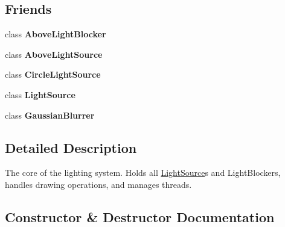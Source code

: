 \subsection*{Friends}
\begin{DoxyCompactItemize}
\item 
class {\bfseries Above\+Light\+Blocker}\hypertarget{classlighting_1_1LightLayer_a1c89aa6deb964112100d6dfe018a3108}{}\label{classlighting_1_1LightLayer_a1c89aa6deb964112100d6dfe018a3108}

\item 
class {\bfseries Above\+Light\+Source}\hypertarget{classlighting_1_1LightLayer_a7494ceda86b0415487e89ecf06ca36f8}{}\label{classlighting_1_1LightLayer_a7494ceda86b0415487e89ecf06ca36f8}

\item 
class {\bfseries Circle\+Light\+Source}\hypertarget{classlighting_1_1LightLayer_a2224497c267a19fc733115a90d16fd8f}{}\label{classlighting_1_1LightLayer_a2224497c267a19fc733115a90d16fd8f}

\item 
class {\bfseries Light\+Source}\hypertarget{classlighting_1_1LightLayer_a971d7f7b2685acda99cf00ca1c51e00d}{}\label{classlighting_1_1LightLayer_a971d7f7b2685acda99cf00ca1c51e00d}

\item 
class {\bfseries Gaussian\+Blurrer}\hypertarget{classlighting_1_1LightLayer_a93d13798acd08628a765e19044a239ee}{}\label{classlighting_1_1LightLayer_a93d13798acd08628a765e19044a239ee}

\end{DoxyCompactItemize}


\subsection{Detailed Description}
The core of the lighting system. Holds all \hyperlink{classlighting_1_1LightSource}{Light\+Source}s and Light\+Blockers, handles drawing operations, and manages threads. 



\subsection{Constructor \& Destructor Documentation}
